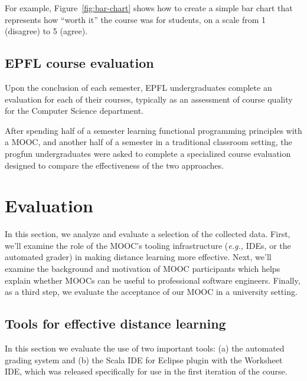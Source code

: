 \documentclass{sig-alternate}
\begin{document}
For example, Figure~\ref{fig:bar-chart} shows how to create a simple bar chart
that represents how ``worth it'' the course was for students, on a scale from
1 (disagree) to 5 (agree).



\subsection{EPFL course evaluation}

Upon the conclusion of each semester, EPFL undergraduates complete an evaluation for
each of their courses, typically as an assessment of course quality for the Computer
Science department.

After spending half of a semester learning functional programming principles with a
MOOC, and another half of a semester in a traditional classroom setting, the progfun
undergraduates were asked to complete a specialized course evaluation designed to compare
the effectiveness of the two approaches.

\section{Evaluation}
\label{sec:eval}

In this section, we analyze and evaluate a selection of the collected data.
First, we'll examine the role of the MOOC's tooling infrastructure
(\emph{e.g.,} IDEs, or the automated grader) in making distance learning more effective.
Next, we'll examine the background and motivation of MOOC participants which helps
explain whether MOOCs can be useful to professional software engineers. Finally,
as a third step, we evaluate the acceptance of our MOOC in a university setting.

\subsection{Tools for effective distance learning}

In this section we evaluate the use of two important tools: (a) the automated
grading system and (b) the Scala IDE for Eclipse plugin with the Worksheet IDE,
which was released specifically for use in the first iteration of the course.
\end{document}
